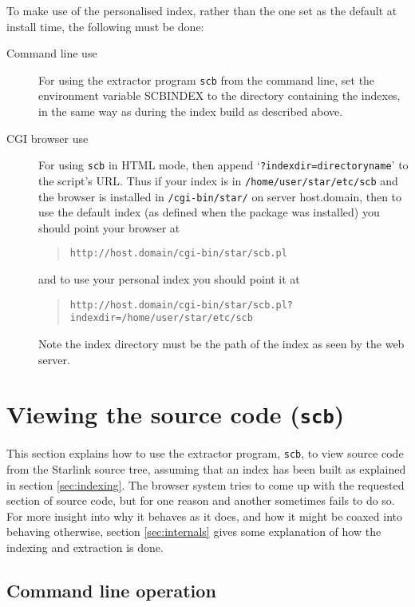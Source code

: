 \documentclass[twoside,11pt]{article}
\newcommand{\xlabel}[1]{}
\renewcommand{\_}{\texttt{\symbol{95}}}
\begin{document}
To make use of the personalised index, rather than the one set as
the default at install time, the following must be done:
\begin{description}
\item[Command line use]
For using the extractor program {\tt scb} from the command line, 
set the environment variable SCB\_INDEX to the directory containing
the indexes, in the same way as during the index build as described
above.
\item[CGI browser use]
For using {\tt scb} in HTML mode, then append 
`{\tt ?indexdir=directoryname}' to the script's URL.
Thus if your index is in {\tt /home/user/star/etc/scb}
and the browser is installed in {\tt /cgi-bin/star/} on server
host.domain, then to use the default index (as defined when the
package was installed) you should point
your browser at
\begin{quote}
\begin{verbatim}
http://host.domain/cgi-bin/star/scb.pl
\end{verbatim}
\end{quote}
and to use your personal index you should point it at
\begin{quote}
\begin{verbatim}
http://host.domain/cgi-bin/star/scb.pl?indexdir=/home/user/star/etc/scb
\end{verbatim}
\end{quote}
Note the index directory must be the path of the index as seen by
the web server.
\end{description}


\section{\xlabel{sec:extract}\label{sec:extract}Viewing the source code
         ({\tt scb})}

This section explains how to use the extractor program, {\tt scb},
to view source code from the Starlink source tree,
assuming that an index has been built as explained in 
section \ref{sec:indexing}.
The browser system tries to come up with the requested section of
source code, but for one reason and another sometimes fails to 
do so.  
For more insight into why it behaves as it does, and 
how it might be coaxed into behaving otherwise, 
section \ref{sec:internals} gives some explanation of how the
indexing and extraction is done.


\subsection{\xlabel{sec:extract-commandline}\label{sec:extract-commandline}Command line operation}
\end{document}
